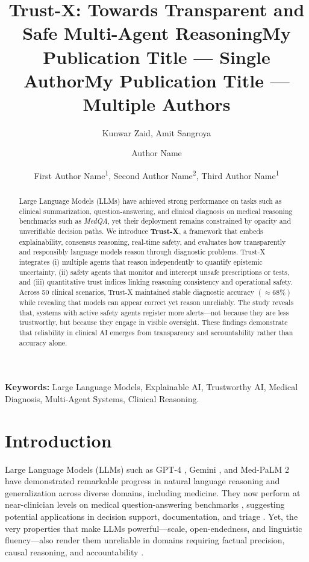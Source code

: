 \documentclass[letterpaper]{article} %
\title{Trust-X: Towards Transparent and Safe Multi-Agent Reasoning}
\author{
Kunwar Zaid,
Amit Sangroya
}
\title{My Publication Title --- Single Author}
\author {
    Author Name
}
\title{My Publication Title --- Multiple Authors}
\author {
    First Author Name\textsuperscript{\rm 1},
    Second Author Name\textsuperscript{\rm 2},
    Third Author Name\textsuperscript{\rm 1}
}
\begin{document}
\maketitle

\begin{abstract}
Large Language Models (LLMs) have achieved strong performance on tasks such as clinical summarization, question-answering, and clinical diagnosis on medical reasoning benchmarks such as \textit{MedQA}, yet their deployment remains constrained by opacity and unverifiable decision paths. We introduce \textbf{Trust-X}, a framework that embeds explainability, consensus reasoning, real-time safety, and evaluates how transparently  and responsibly language models reason through diagnostic problems. Trust-X integrates (i) multiple agents that reason independently to quantify epistemic uncertainty, (ii) safety agents that monitor and intercept unsafe prescriptions or tests, and (iii) quantitative trust indices linking reasoning consistency and operational safety. Across 50 clinical scenarios, Trust-X maintained stable diagnostic accuracy $(\approx68\%)$ while revealing that models can appear correct yet reason unreliably. The study reveals that, systems with active safety agents register more alerts—not because they are less trustworthy, but because they engage in visible oversight. These findings demonstrate that reliability in clinical AI emerges from transparency and accountability rather than accuracy alone.
\end{abstract}




\textbf{Keywords:} Large Language Models, Explainable AI, Trustworthy AI, Medical Diagnosis, Multi-Agent Systems, Clinical Reasoning.

\section{Introduction}

Large Language Models (LLMs) such as GPT-4 \cite{achiam2023gpt}, Gemini \cite{team2023gemini}, and Med-PaLM 2 \cite{singhal2025toward} have demonstrated remarkable progress in natural language reasoning and generalization across diverse domains, including medicine. They now perform at near-clinician levels on medical question-answering benchmarks \cite{kung2023performance,nori2023capabilities}, suggesting potential applications in decision support, documentation, and triage \cite{lee2023benefits}. Yet, the very properties that make LLMs powerful—scale, open-endedness, and linguistic fluency—also render them unreliable in domains requiring factual precision, causal reasoning, and accountability \cite{ji2023survey,begoli2019need}.
\end{document}
